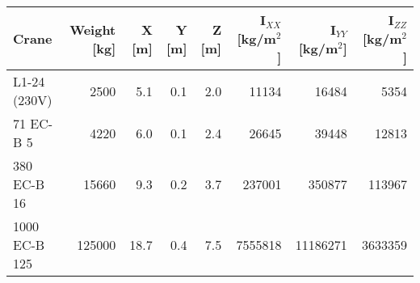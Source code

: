 \documentclass{standalone}
\begin{document}
\begin{tabular}{lrrrrrrr}\toprule
    \textbf{Crane}
        & \textbf{Weight} [kg]
        & \textbf{X} [m]
        & \textbf{Y} [m]
        & \textbf{Z} [m]
        & \textbf{I$_{XX}$} [kg/m$^2$]
        & \textbf{I$_{YY}$} [kg/m$^2$]
        & \textbf{I$_{ZZ}$} [kg/m$^2$]\\
    \midrule
    L1-24 (230V) & 2500 & 5.1 & 0.1 & 2.0 & 11134 & 16484 & 5354 \\
    71 EC-B 5 & 4220 & 6.0 & 0.1 & 2.4 & 26645 & 39448 & 12813 \\
    380 EC-B 16 & 15660 & 9.3 & 0.2 & 3.7 & 237001 & 350877 & 113967 \\
    1000 EC-B 125 & 125000 & 18.7 & 0.4 & 7.5 & 7555818 & 11186271 & 3633359 \\
    \bottomrule
\end{tabular}
\end{document}
